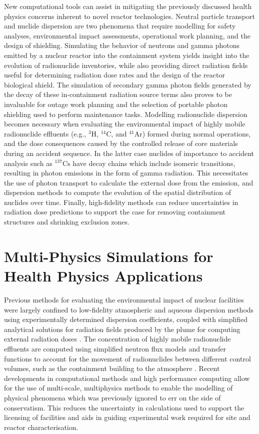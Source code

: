 New computational tools can assist in mitigating the previously discussed health physics concerns inherent to novel reactor technologies. Neutral particle transport and nuclide dispersion are two phenomena that require modelling for safety analyses, environmental impact assessments, operational work planning, and the design of shielding. Simulating the behavior of neutrons and gamma photons emitted by a nuclear reactor into the containment system yields insight into the evolution of radionuclide inventories, while also providing direct radiation fields useful for determining radiation dose rates and the design of the reactor biological shield. The simulation of secondary gamma photon fields generated by the decay of these in-containment radiation source terms also proves to be invaluable for outage work planning and the selection of portable photon shielding used to perform maintenance tasks. Modelling radionuclide dispersion becomes necessary when evaluating the environmental impact of highly mobile radionuclide effluents (e.g., $\mathrm{^{3}H}$, $\mathrm{^{14}C}$, and $\mathrm{^{41}Ar}$) formed during normal operations, and the dose consequences caused by the controlled release of core materials during an accident sequence. In the latter case nuclides of importance to accident analysis such as $\mathrm{^{137}Cs}$ \cite{regdoc_2_5_2} have decay chains which include isomeric transitions, resulting in photon emissions in the form of gamma radiation. This necessitates the use of photon transport to calculate the external dose from the emission, and dispersion methods to compute the evolution of the spatial distribution of nuclides over time. Finally, high-fidelity methods can reduce uncertainties in radiation dose predictions to support the case for removing containment structures and shrinking exclusion zones. 

\section{Multi-Physics Simulations for Health Physics Applications}
\label{introduction:ms}

Previous methods for evaluating the environmental impact of nuclear facilities were largely confined to low-fidelity atmospheric and aqueous dispersion methods using experimentally determined dispersion coefficients, coupled with simplified analytical solutions for radiation fields produced by the plume for computing external radiation doses \cite{nf_rdd_trials_i,nf_rdd_trials_ii,n_288_1_20,n_288_2_19}. The concentration of highly mobile radionuclide effluents are computed using simplified neutron flux models and transfer functions to account for the movement of radionuclides between different control volumes, such as the containment building to the atmosphere \cite{ar41_triga_1,n_288_1_20}. Recent developments in computational methods and high performance computing allow for the use of multi-scale, multiphysics methods to enable the modelling of physical phenomena which was previously ignored to err on the side of conservatism. This reduces the uncertainty in calculations used to support the licensing of facilities and aids in guiding experimental work required for site and reactor characterisation.

